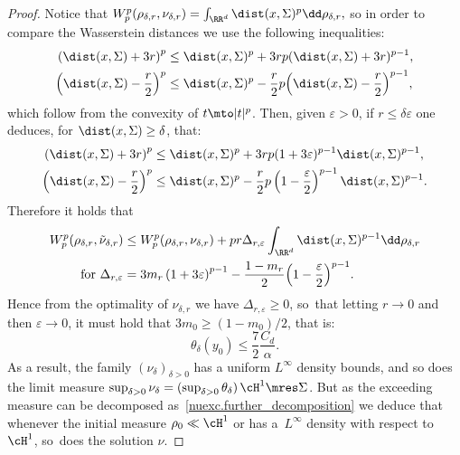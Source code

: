 \begin{proof}
Notice that
$
W_p^p(\rho_{\delta, r},\nu_{\delta, r})
=
\int_{\RR^d} \dist(x,\Sigma)^p\dd \rho_{\delta,r},
$
so in order to compare the Wasserstein distances we use the following inequalities:
\begin{align*}
\left(\dist(x,\Sigma) + 3r\right)^p
&\le
\dist(x,\Sigma)^p
+
3rp
(\dist(x,\Sigma)+3r)^{p-1}, \\
\left(\dist(x,\Sigma) -\frac{r}{2}\right)^p
&\le
\dist(x,\Sigma)^p
-
\frac{r}{2}p
\Bigl(\dist(x,\Sigma)-\frac{r}{2}\Bigr)^{p-1},
\end{align*}
which follow from the convexity of $t\mto |t|^p$.
Then, given $\varepsilon>0$, if $r\le \delta\varepsilon$ one deduces,
for $\dist(x,\Sigma)\ge \delta$, that:
\begin{align*}
\left(\dist(x,\Sigma) + 3r\right)^p
&\le
\dist(x,\Sigma)^p
+
3 r p(1+3\varepsilon)^{p-1}
\dist(x,\Sigma)^{p-1}, \\
\left(\dist(x,\Sigma) -\frac{r}{2}\right)^p
&\le
\dist(x,\Sigma)^p
-
\frac{r}{2}p \left(1-\frac{\varepsilon}{2}\right)^{p-1}
\dist(x,\Sigma)^{p-1}.
\end{align*}
Therefore it holds that
\begin{align*}
W_p^p(\rho_{\delta, r}, \tilde\nu_{\delta, r})
&\le
W_p^p(\rho_{\delta, r}, \nu_{\delta, r})
+
pr\Delta_{r,\varepsilon}
\int_{\RR^d}
\dist(x,\Sigma)^{p-1}\dd \rho_{\delta,r}\\
\text{ for }
\Delta_{r,\varepsilon}
&=
3m_{r}
\left(
1 + 3\varepsilon
\right)^{p-1}
-
\frac{1 - m_r}{2}
\Bigl(
1 - \frac{\varepsilon}{2}
\Bigr)^{p-1}.
\end{align*}
Hence from the optimality of $\nu_{\delta,r}$ we have $\Delta_{r,\varepsilon} \ge 0$, so~that letting $r \to 0$ and then $\varepsilon\to 0$, it must hold that
$3 m_0\ge (1-m_0)/2$, that is:
\[
\theta_\delta(y_0)
\le
\frac{7}{2}\frac{C_d}{\alpha}.
\]
As a result, the family $\left(\nu_\delta\right)_{\delta > 0}$ has a uniform $L^\infty$ density bounds, and so does the limit measure $\sup_{\delta > 0} \nu_\delta = \left(\sup_{\delta > 0}\theta_\delta\right)\cH^1\mres \Sigma$. But as the exceeding measure can be decomposed as~\eqref{nuexc.further_decomposition} we deduce that
whenever the initial measure $\rho_0 \ll \cH^1$ or has a~$L^{\infty}$ density with respect to $\cH^1$, so~does the solution $\nu$.
\end{proof}

